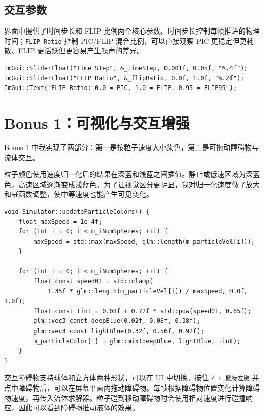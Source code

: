 \documentclass[UTF8,a4paper,11pt]{ctexart}
\begin{document}
\subsection{交互参数}

界面中提供了时间步长和 FLIP 比例两个核心参数。时间步长控制每帧推进的物理时间；\texttt{FLIP Ratio} 控制 PIC/FLIP 混合比例，可以直接观察 PIC 更稳定但更耗散、FLIP 更活跃但更容易产生噪声的差异。

\begin{lstlisting}[style=cppstyle,caption={基础交互参数}]
ImGui::SliderFloat("Time Step", &_timeStep, 0.001f, 0.05f, "%.4f");
ImGui::SliderFloat("FLIP Ratio", &_flipRatio, 0.0f, 1.0f, "%.2f");
ImGui::Text("FLIP Ratio: 0.0 = PIC, 1.0 = FLIP, 0.95 = FLIP95");
\end{lstlisting}

\section{Bonus 1：可视化与交互增强}

Bonus 1 中我实现了两部分：第一是按粒子速度大小染色，第二是可拖动障碍物与流体交互。

粒子颜色使用速度归一化后的结果在深蓝和浅蓝之间插值。静止或低速区域为深蓝色，高速区域逐渐变成浅蓝色。为了让视觉区分更明显，我对归一化速度做了放大和幂函数调整，使中等速度也能产生可见变化。

\begin{lstlisting}[style=cppstyle,caption={按速度大小进行蓝色系染色}]
void Simulator::updateParticleColors() {
    float maxSpeed = 1e-4f;
    for (int i = 0; i < m_iNumSpheres; ++i) {
        maxSpeed = std::max(maxSpeed, glm::length(m_particleVel[i]));
    }

    for (int i = 0; i < m_iNumSpheres; ++i) {
        float const speed01 = std::clamp(
            1.35f * glm::length(m_particleVel[i]) / maxSpeed, 0.0f, 1.0f);
        float const tint = 0.08f + 0.72f * std::pow(speed01, 0.65f);
        glm::vec3 const deepBlue(0.02f, 0.08f, 0.38f);
        glm::vec3 const lightBlue(0.32f, 0.56f, 0.92f);
        m_particleColor[i] = glm::mix(deepBlue, lightBlue, tint);
    }
}
\end{lstlisting}

交互障碍物支持球体和立方体两种形状，可以在 UI 中切换。按住 \texttt{Z + 鼠标左键} 并点中障碍物后，可以在屏幕平面内拖动障碍物。每帧根据障碍物位置变化计算障碍物速度，再传入流体求解器。粒子碰到移动障碍物时会使用相对速度进行碰撞响应，因此可以看到障碍物推动液体的效果。
\end{document}
